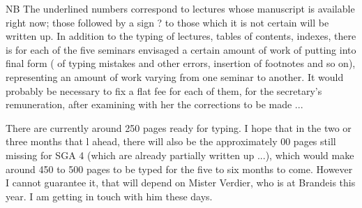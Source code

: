 
NB The underlined numbers correspond to lectures whose manuscript is available right now; those followed by a sign ? to those which it is not certain will be written up. In addition to the typing of lectures, tables of contents, indexes, there is for each of the five seminars envisaged a certain amount of work of putting into final form ( of typing mistakes and other errors, insertion of footnotes and so on), representing an amount of work varying from one seminar to another. It would probably be necessary to fix a flat fee for each of them, for the secretary's remuneration, after examining with her the corrections to be made ...

There are currently around 250 pages ready for typing. I hope that in the two or three months that l ahead, there will also be the approximately 00 pages still missing for SGA 4 (which are already partially written up ...), which would make around 450 to 500 pages to be typed for the five to six months to come. However I cannot guarantee it, that will depend on Mister Verdier, who is at Brandeis this year. I am getting in touch with him these days.
